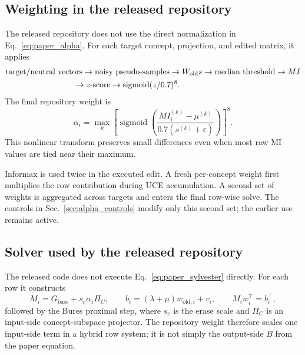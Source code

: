 \documentclass[11pt]{article}
\begin{document}
\subsection{Weighting in the released repository}
The released repository \cite{scaprecode} does not use the direct normalization in Eq.~\eqref{eq:paper_alpha}. For each target concept, projection, and edited matrix, it applies
\begin{equation}
\begin{aligned}
&\text{target/neutral vectors}
\rightarrow \text{noisy pseudo-samples}
\rightarrow W_{\mathrm{old}}s
\rightarrow \text{median threshold}
\rightarrow MI\\
&\hspace{3.0cm}\rightarrow z\text{-score}
\rightarrow \operatorname{sigmoid}(z/0.7)^8.
\end{aligned}
\end{equation}
The final repository weight is
\begin{equation}
    \alpha_i=\max_k
    \left[
    \operatorname{sigmoid}\left(
    \frac{MI_i^{(k)}-\mu^{(k)}}{0.7(s^{(k)}+\varepsilon)}
    \right)
    \right]^8.
    \label{eq:repo_alpha}
\end{equation}
This nonlinear transform preserves small differences even when most raw MI values are tied near their maximum.

Informax is used twice in the executed edit. A fresh per-concept weight first multiplies the row contribution during UCE accumulation. A second set of weights is aggregated across targets and enters the final row-wise solve. The controls in Sec.~\ref{sec:alpha_controls} modify only this second set; the earlier use remains active.

\subsection{Solver used by the released repository}
The released code does not execute Eq.~\eqref{eq:paper_sylvester} directly. For each row it constructs
\begin{equation}
    M_i=G_{\mathrm{base}}+s_e\alpha_i\Pi_C,
    \qquad
    b_i=(\lambda+\mu)w_{\mathrm{old},i}+v_i,
    \qquad
    M_i w_i^{\top}=b_i^{\top},
    \label{eq:repo_solver}
\end{equation}
followed by the Bures proximal step, where $s_e$ is the erase scale and $\Pi_C$ is an input-side concept-subspace projector. The repository weight therefore scales one input-side term in a hybrid row system; it is not simply the output-side $B$ from the paper equation.
\end{document}
